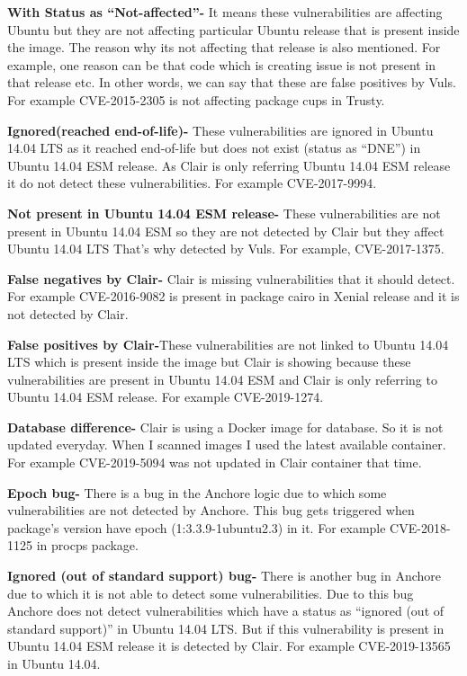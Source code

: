 \documentclass[a4paper,num-refs]{oup-contemporary}
\begin{document}
\textbf{With Status as “Not-affected”-} It means these vulnerabilities are affecting Ubuntu but they are not 
affecting particular Ubuntu release that is present inside the image. The reason why its not affecting 
that release is also mentioned. For example, one reason can be that code which is creating issue is not 
present in that release etc. In other words, we can say that these are false positives by Vuls.
For example CVE-2015-2305 is not affecting package cups in Trusty.

\textbf{Ignored(reached end-of-life)-} These vulnerabilities are ignored in Ubuntu 14.04 LTS as it reached end-of-life 
but does not exist (status as “DNE”) in Ubuntu 14.04 ESM release. As Clair is only referring Ubuntu 14.04 ESM 
release it do not detect these vulnerabilities. For example CVE-2017-9994.

\textbf{Not present in Ubuntu 14.04 ESM release-} These vulnerabilities are not present in Ubuntu 14.04 ESM so they 
are not detected by Clair but they affect Ubuntu 14.04 LTS That’s why detected by Vuls. For example, CVE-2017-1375.

\textbf{False negatives by Clair-} Clair is missing vulnerabilities that it should detect. For example CVE-2016-9082 
is present in package cairo in Xenial release and it is not detected by Clair.

\textbf{False positives by Clair-}These vulnerabilities are not linked to Ubuntu 14.04 LTS which is 
present inside the image but Clair is showing because these vulnerabilities are present in Ubuntu 14.04 ESM and 
Clair is only referring to Ubuntu 14.04 ESM release. For example CVE-2019-1274.

\textbf{Database difference-} Clair is using a Docker image for database. So it is not updated everyday. 
		When I scanned images I used the latest available container. For example CVE-2019-5094 was not 
		updated in Clair container that time.

\textbf{Epoch bug-} There is a bug in the Anchore logic due to which some vulnerabilities are 
		not detected by Anchore. This bug gets triggered when package’s version have epoch 
		(1:3.3.9-1ubuntu2.3)  in it. For example CVE-2018-1125 in procps package.

\textbf{Ignored (out of standard support) bug-} There is another bug in Anchore due to 
		which it is not able to detect some vulnerabilities. Due to this bug Anchore does not detect 
		vulnerabilities which have a status as “ignored (out of standard support)” in Ubuntu 14.04 LTS. 
		But if this vulnerability is present in Ubuntu 14.04 ESM release it is detected by Clair. 
		For example CVE-2019-13565 in Ubuntu 14.04.
\end{document}
